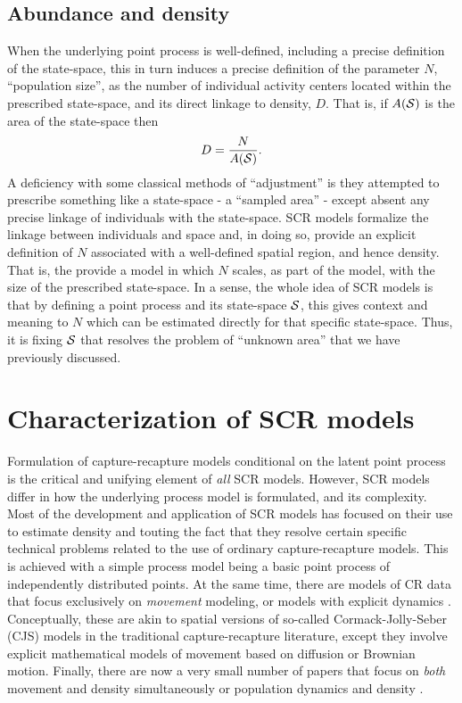 \subsection{Abundance and density}

When the underlying point process is well-defined, including a precise
definition of the state-space, this in turn induces a precise
definition of the parameter $N$, ``population size'', as the number of
individual activity centers located within the prescribed state-space,
and its direct linkage to density, $D$. That is, if $A({\cal S})$ is
the area of the state-space then
\[
 D = \frac{N}{ A({\cal S})}.
\]
A deficiency with some classical methods of ``adjustment'' is they
attempted to prescribe something like a state-space - a ``sampled
area'' - except absent any precise linkage of individuals with the
state-space. SCR models formalize the linkage between individuals and
space and, in doing so, provide an explicit definition of $N$
associated with a well-defined spatial region, and hence density. That
is, the provide a model in which $N$ scales, as part of the model,
with the size of the prescribed state-space. In a sense, the whole
idea of SCR models is that by defining a point process and its
state-space ${\cal S}$, this gives context and meaning to $N$ which
can be estimated directly for that specific state-space. Thus, it is
fixing ${\cal S}$ that resolves the problem of ``unknown area'' that
we have previously discussed.



\section{Characterization of SCR models}

Formulation of capture-recapture models conditional on the latent
point process is the critical and unifying element of {\it all} SCR
models.
However, SCR models differ in how the underlying process model is formulated,
and its complexity.  Most of the development and application of SCR
models has focused on their use to estimate density and touting the
fact that they resolve certain specific technical problems related to
the use of ordinary capture-recapture models. This is achieved with a
simple process model being a basic point process of independently
distributed points.  At the same time, there are models of CR data
that focus exclusively on {\it movement} modeling, or models with
explicit dynamics \citep{ovaskainen:2004,
  ovaskainen_etal:2008}. Conceptually, these are akin to spatial
versions of so-called Cormack-Jolly-Seber (CJS) models in the
traditional capture-recapture literature, except they involve explicit
mathematical models of movement based on diffusion or Brownian motion.
Finally, there are now a very small number of papers that focus on
{\it both} movement and density simultaneously
\citep{royle_young:2008, royle_etal:2011mee, royle_chandler:2012} or
population dynamics and density \citep{gardner_etal:2010jwm}.

